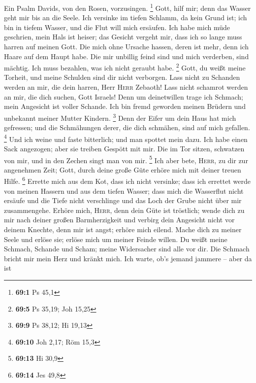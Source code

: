  Ein Psalm Davids, von den Rosen, vorzusingen. \footnote{\textbf{69:1}
  Ps 45,1}  Gott, hilf mir; denn das Wasser geht mir bis
an die Seele.  Ich versinke im tiefen Schlamm, da kein
Grund ist; ich bin in tiefem Wasser, und die Flut will mich ersäufen.
 Ich habe mich müde geschrien, mein Hals ist heiser; das
Gesicht vergeht mir, dass ich so lange muss harren auf meinen Gott.
 Die mich ohne Ursache hassen, deren ist mehr, denn ich
Haare auf dem Haupt habe. Die mir unbillig feind sind und mich
verderben, sind mächtig. Ich muss bezahlen, was ich nicht geraubt habe.
\footnote{\textbf{69:5} Ps 35,19; Joh 15,25}  Gott, du
weißt meine Torheit, und meine Schulden sind dir nicht verborgen.
 Lass nicht zu Schanden werden an mir, die dein harren,
Herr \textsc{Herr} Zebaoth! Lass nicht schamrot werden an mir, die dich
suchen, Gott Israels!  Denn um deinetwillen trage ich
Schmach; mein Angesicht ist voller Schande.  Ich bin fremd
geworden meinen Brüdern und unbekannt meiner Mutter Kindern. \footnote{\textbf{69:9}
  Ps 38,12; Hi 19,13}  Denn der Eifer um dein Haus hat
mich gefressen; und die Schmähungen derer, die dich schmähen, sind auf
mich gefallen. \footnote{\textbf{69:10} Joh 2,17; Röm 15,3}
 Und ich weine und faste bitterlich; und man spottet mein
dazu.  Ich habe einen Sack angezogen; aber sie treiben
Gespött mit mir.  Die im Tor sitzen, schwatzen von mir,
und in den Zechen singt man von mir. \footnote{\textbf{69:13} Hi 30,9}
 Ich aber bete, \textsc{Herr}, zu dir zur angenehmen
Zeit; Gott, durch deine große Güte erhöre mich mit deiner treuen Hilfe.
\footnote{\textbf{69:14} Jes 49,8}  Errette mich aus dem
Kot, dass ich nicht versinke; dass ich errettet werde von meinen Hassern
und aus dem tiefen Wasser;  dass mich die Wasserflut
nicht ersäufe und die Tiefe nicht verschlinge und das Loch der Grube
nicht über mir zusammengehe.  Erhöre mich, \textsc{Herr},
denn dein Güte ist tröstlich; wende dich zu mir nach deiner großen
Barmherzigkeit  und verbirg dein Angesicht nicht vor
deinem Knechte, denn mir ist angst; erhöre mich eilend. 
Mache dich zu meiner Seele und erlöse sie; erlöse mich um meiner Feinde
willen.  Du weißt meine Schmach, Schande und Scham; meine
Widersacher sind alle vor dir.  Die Schmach bricht mir
mein Herz und kränkt mich. Ich warte, ob's jemand jammere -- aber da ist
